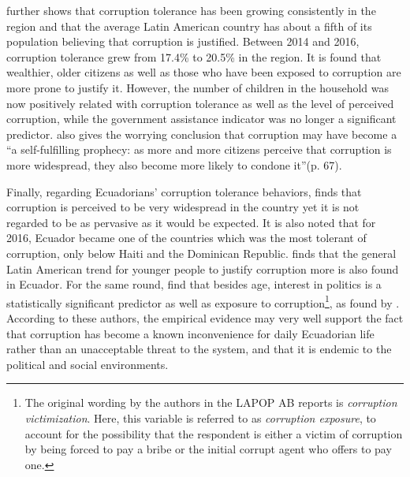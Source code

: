\documentclass[floatsintext,man]{apa7}\usepackage[]{graphicx}\usepackage[]{color}
\begin{document}
\textcite{Lupu.2017} further shows that corruption tolerance has been growing consistently in the region and that the average Latin American country has about a fifth of its population believing that corruption is justified. Between 2014 and 2016, corruption tolerance grew from 17.4\% to 20.5\% in the region. It is found that wealthier, older citizens as well as those who have been exposed to corruption are more prone to justify it. However, the number of children in the household was now positively related with corruption tolerance as well as the level of perceived corruption, while the government assistance indicator was no longer a significant predictor. \textcite{Lupu.2017} also gives the worrying conclusion that corruption may have become a \enquote{a self-fulfilling prophecy: as more and more citizens perceive that corruption is more widespread, they also become more likely to condone it}(p. 67). 

Finally, regarding Ecuadorians' corruption tolerance behaviors, \textcite{Moscoso.2018} finds that corruption is perceived to be very widespread in the country yet it is not regarded to be as pervasive as it would be expected. It is also noted that for 2016, Ecuador became one of the countries which was the most tolerant of corruption, only below Haiti and the Dominican Republic. \textcite{Montalvo.2019} finds that the general Latin American trend for younger people to justify corruption more is also found in Ecuador. For the same round, \textcite{Moscoso.2020} find that besides age, interest in politics is a statistically significant predictor as well as exposure to corruption\footnote{The original wording by the authors in the LAPOP AB reports is \textit{corruption victimization}. Here, this variable is referred to as \textit{corruption exposure}, to account for the possibility that the respondent is either a victim of corruption by being forced to pay a bribe or the initial corrupt agent who offers to pay one.}, as found by \textcite{Lupu.2017}. According to these authors, the empirical evidence may very well support the fact that corruption has become a known inconvenience for daily Ecuadorian life rather than an unacceptable threat to the system, and that it is endemic to the political and social environments. 



\clearpage

\end{document}

